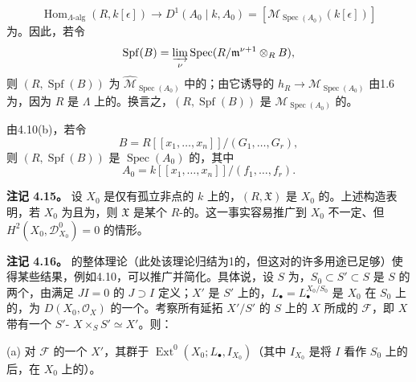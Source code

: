 \[
\operatorname{Hom}_{\Lambda\text{-alg}}(R,k[\epsilon])\longrightarrow
D^1(A_0\mid k,A_0)=[\mathcal M_{\operatorname{Spec}(A_0)}(k[\epsilon])]
\]
为。因此，若令
\[
\operatorname{Spf}(B)=\varinjlim_\nu\operatorname{Spec}(R/\mathfrak m^{\nu+1}\otimes_R B),
\]
则 $(R,\operatorname{Spf}(B))$ 为 $\widehat{\mathcal M}_{\operatorname{Spec}(A_0)}$ 中的；由它诱导的 $h_R\to\mathcal M_{\operatorname{Spec}(A_0)}$ 由1.6为，因为 $R$ 是 $\Lambda$ 上的。换言之，$(R,\operatorname{Spf}(B))$ 是 $\mathcal M_{\operatorname{Spec}(A_0)}$ 的。

由4.10(b)，若令
\[
B=R[[x_1,\ldots,x_n]]/(G_1,\ldots,G_r),
\]
则 $(R,\operatorname{Spf}(B))$ 是 $\operatorname{Spec}(A_0)$ 的，其中
\[
A_0=k[[x_1,\ldots,x_n]]/(f_1,\ldots,f_r).
\]

\textbf{注记 4.15。} 设 $X_0$ 是仅有孤立非点的 $k$ 上的，$(R,\mathfrak X)$ 是 $X_0$ 的。上述构造表明，若 $X_0$ 为且为，则 $\mathfrak X$ 是某个 $R$-的。这一事实容易推广到 $X_0$ 不一定、但 $H^2(X_0,\mathcal D^0_{X_0})=0$ 的情形。

\textbf{注记 4.16。} 的整体理论（此处该理论归结为1的，但这对的许多用途已足够）使得某些结果，例如4.10，可以推广并简化。具体说，设 $S$ 为，$S_0\subset S'\subset S$ 是 $S$ 的两个，由满足 $JI=0$ 的 $J\supset I$ 定义；$X'$ 是 $S'$ 上的，$L_\bullet=L_\bullet^{X_0/S_0}$ 是 $X_0$ 在 $S_0$ 上的，为 $D(X_0,\mathcal O_X)$ 的一个。考察所有延拓 $X'/S'$ 的 $S$ 上的 $X$ 所成的 $\mathcal F$，即 $X$ 带有一个 $S'$- $X\times_S S'\simeq X'$。则：

(a) 对 $\mathcal F$ 的一个 $X'$，其群于 $\operatorname{Ext}^0(X_0;L_\bullet,I_{X_0})$（其中 $I_{X_0}$ 是将 $I$ 看作 $S_0$ 上的后，在 $X_0$ 上的）。

